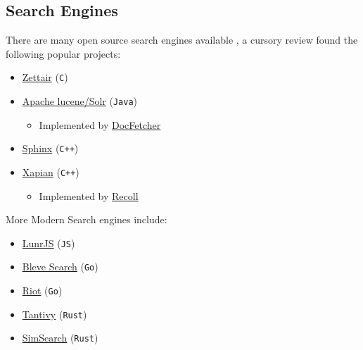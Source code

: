 \documentclass[a4paper,11pt,twoside]{article}
\begin{document}
\subsection{Search Engines}
\label{sec:org6d5b374}
There are many open source search engines available , a cursory review
found the following popular projects:

\begin{itemize}
\item \href{https://github.com/cyclaero/zettair}{Zettair} (\texttt{C}) \cite{jansenCyclaeroZettair2020}
\item \href{https://github.com/apache/lucene-solr}{Apache lucene/Solr} (\texttt{Java}) \cite{apachesoftwarefoundationLearningRankApache2017}
\begin{itemize}
\item Implemented by \href{https://sourceforge.net/p/docfetcher/code/ci/master/tree/}{DocFetcher} \cite{docfetcherdevelopmentteamDocFetcherFastDocument}
\end{itemize}
\item \href{https://github.com/sphinxsearch/sphinx}{Sphinx} (\texttt{C++}) \cite{yurischapovSphinxsearchSphinx2021}
\item \href{https://github.com/kevinduraj/xapian-search}{Xapian} (\texttt{C++}) \cite{ollybettsXapianXapian2021}
\begin{itemize}
\item Implemented by \href{https://www.lesbonscomptes.com/recoll/}{Recoll} \cite{jean-francoisdockesRecollUserManual}
\end{itemize}
\end{itemize}

More Modern Search engines include:

\begin{itemize}
\item \href{https://github.com/olivernn/lunr.js/}{LunrJS}  (\texttt{JS}) \cite{nightingaleOlivernnLunrJs2021}
\item \href{https://github.com/blevesearch/bleve}{Bleve Search} (\texttt{Go}) \cite{martyschochBleveSearchDocumentation}
\item \href{https://github.com/go-ego/riot}{Riot} (\texttt{Go}) \cite{vzGoegoRiot2021}
\item \href{https://github.com/tantivy-search/tantivy}{Tantivy} (\texttt{Rust}) \cite{clementrenaultMeilisearchMeiliSearch2021}
\item \href{https://github.com/andylokandy/simsearch-rs}{SimSearch} (\texttt{Rust}) \cite{lokAndylokandySimsearchrs2021}
\end{itemize}
\end{document}
